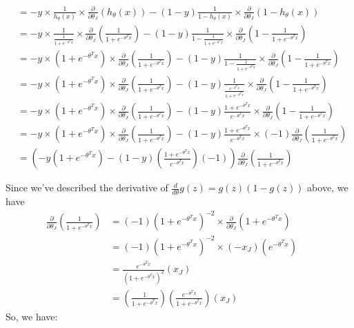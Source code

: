 \documentclass[12pt]{article} %
\newcommand{\D}{\partial}
\begin{document}
\begin{flushleft}
\begin{enumerate}
\begin{align*}
			&= -y\times \frac{1}{h_{\theta}(x)} \times \frac{\D}{\D\theta_J}(h_\theta(x)) - (1-y) \frac{1}{1 - h_{\theta}(x)}\times \frac{\D}{\D\theta_J}(1-h_\theta(x)) &&\\
			&= -y\times \frac{1}{\frac{1}{1+e^{-\theta^Tx}}} \times \frac{\D}{\D\theta_J}(\frac{1}{1+e^{-\theta^Tx}}) - (1-y) \frac{1}{1 - \frac{1}{1+e^{-\theta^Tx}}}\times \frac{\D}{\D\theta_J}(1-\frac{1}{1+e^{-\theta^Tx}}) &&\\
			&= -y\times (1+e^{-\theta^Tx}) \times \frac{\D}{\D\theta_J}(\frac{1}{1+e^{-\theta^Tx}}) - (1-y) \frac{1}{1 - \frac{1}{1+e^{-\theta^Tx}}}\times \frac{\D}{\D\theta_J}(1-\frac{1}{1+e^{-\theta^Tx}}) &&\\
			&= -y\times (1+e^{-\theta^Tx}) \times \frac{\D}{\D\theta_J}(\frac{1}{1+e^{-\theta^Tx}}) - (1-y) \frac{1}{\frac{e^{-\theta^Tx}}{1+e^{-\theta^Tx}}}\times \frac{\D}{\D\theta_J}(1-\frac{1}{1+e^{-\theta^Tx}}) &&\\
			&= -y\times (1+e^{-\theta^Tx}) \times \frac{\D}{\D\theta_J}(\frac{1}{1+e^{-\theta^Tx}}) - (1-y) \frac{1+e^{-\theta^Tx}}{e^{-\theta^Tx}}\times \frac{\D}{\D\theta_J}(1-\frac{1}{1+e^{-\theta^Tx}}) &&\\
			&= -y\times (1+e^{-\theta^Tx}) \times \frac{\D}{\D\theta_J}(\frac{1}{1+e^{-\theta^Tx}}) - (1-y) \frac{1+e^{-\theta^Tx}}{e^{-\theta^Tx}}\times (-1)\frac{\D}{\D\theta_J}(\frac{1}{1+e^{-\theta^Tx}}) &&\\
			&= (-y(1+e^{-\theta^Tx}) - (1-y)(\frac{1+e^{-\theta^Tx}}{e^{-\theta^Tx}})(-1)) \frac{\D}{\D\theta_J}(\frac{1}{1+e^{-\theta^Tx}})
		\end{align*}


		Since we've described the derivative of $\frac{d}{d\theta}g(z) = g(z)(1-g(z))$ above, we have
		\begin{align*}
			\frac{\D}{\D\theta_J} (\frac{1}{1+e^{-\theta^Tx}}) &= (-1)(1+e^{-\theta^Tx})^{-2} \times \frac{\D}{\D\theta_J} (1+e^{-\theta^Tx})&&\\
			&= (-1)(1+e^{-\theta^Tx})^{-2} \times (-x_J)(e^{-\theta^Tx}) &&\\
			&= \frac{e^{-\theta^Tx}}{(1+e^{-\theta^Tx})^{2}}(x_J) &&\\
			&= (\frac{1}{1+e^{-\theta^Tx}})(\frac{e^{-\theta^Tx}}{1+e^{-\theta^Tx}})(x_J)
		\end{align*}
		So, we have:


\end{enumerate}
\end{flushleft}
\end{document}
